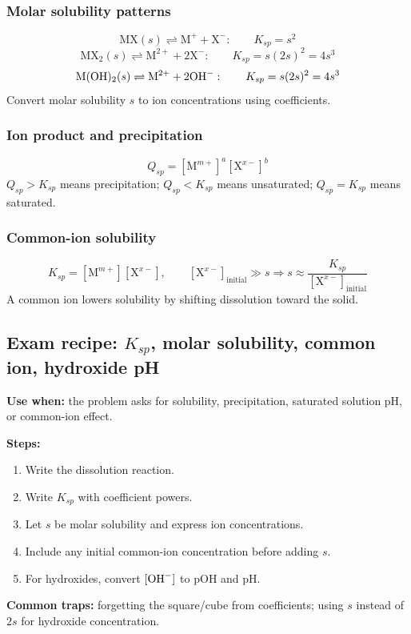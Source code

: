 \subsubsection{Molar solubility patterns}
\[
\mathrm{MX}(s)\rightleftharpoons \mathrm{M}^{+}+\mathrm{X}^{-}: \qquad K_{sp}=s^2
\]
\[
\mathrm{MX_2}(s)\rightleftharpoons \mathrm{M}^{2+}+2\mathrm{X}^{-}: \qquad K_{sp}=s(2s)^2=4s^3
\]
\[
\mathrm{M(OH)_2}(s)\rightleftharpoons \mathrm{M}^{2+}+2\ce{OH-}: \qquad K_{sp}=s(2s)^2=4s^3
\]
Convert molar solubility \(s\) to ion concentrations using coefficients.

\subsubsection{Ion product and precipitation}
\[
Q_{sp}=[\mathrm{M}^{m+}]^a[\mathrm{X}^{x-}]^b
\]
\(Q_{sp}>K_{sp}\) means precipitation; \(Q_{sp}<K_{sp}\) means unsaturated; \(Q_{sp}=K_{sp}\) means saturated.

\subsubsection{Common-ion solubility}
\[
K_{sp}=[\mathrm{M}^{m+}][\mathrm{X}^{x-}], \qquad [\mathrm{X}^{x-}]_{\mathrm{initial}}\gg s \Rightarrow s\approx\frac{K_{sp}}{[\mathrm{X}^{x-}]_{\mathrm{initial}}}
\]
A common ion lowers solubility by shifting dissolution toward the solid.

\subsection{Exam recipe: \(K_{sp}\), molar solubility, common ion, hydroxide pH}
\textbf{Use when:} the problem asks for solubility, precipitation, saturated solution pH, or common-ion effect.

\textbf{Steps:}
\begin{enumerate}
    \item Write the dissolution reaction.
    \item Write \(K_{sp}\) with coefficient powers.
    \item Let \(s\) be molar solubility and express ion concentrations.
    \item Include any initial common-ion concentration before adding \(s\).
    \item For hydroxides, convert \([\ce{OH-}]\) to pOH and pH.
\end{enumerate}

\textbf{Common traps:} forgetting the square/cube from coefficients; using \(s\) instead of \(2s\) for hydroxide concentration.
